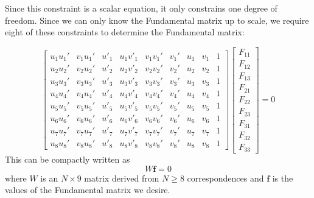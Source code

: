 \documentclass[a4paper, 12pt]{article}
\begin{document}
Since this constraint is a scalar equation, it only constrains one degree of freedom. Since we can only know the Fundamental matrix up to scale, we require eight of these constraints to determine the Fundamental matrix:

\begin{equation}
    \begin{bmatrix}
    u_1u_1' & v_1u_1' & u'_1 & u_1v'_1 &  v_1v_1' & v_1' & u_1 & v_1 & 1 \\ 
    u_2u_2' & v_2u_2' & u'_2 & u_2v'_2 &  v_2v_2' & v_2' & u_2 & v_2 & 1 \\
    u_3u_3' & v_3u_3' & u'_3 & u_3v'_3 &  v_3v_3' & v_3' & u_3 & v_3 & 1 \\
    u_4u_4' & v_4u_4' & u'_4 & u_4v'_4 &  v_4v_4' & v_4' & u_4 & v_4 & 1\\
    u_5u_5' & v_5u_5' & u'_5 & u_5v'_5 &  v_5v_5' & v_5' & u_5 & v_5 & 1\\
    u_6u_6' & v_6u_6' & u'_6 & u_6v'_6 &  v_6v_6' & v_6' & u_6 & v_6 & 1 \\
    u_7u_7' & v_7u_7' & u'_7 & u_7v'_7 &  v_7v_7' & v_7' & u_7 & v_7 & 1 \\
    u_8u_8' & v_8u_8' & u'_8 & u_8v'_8 &  v_8v_8' & v_8' & u_8 & v_8 & 1
    \end{bmatrix}
    \begin{bmatrix}F_{11}\\F_{12}\\F_{13}\\F_{21}\\F_{22}\\F_{23}\\F_{31}\\F_{32}\\F_{33}\end{bmatrix} = 0
\end{equation}
This can be compactly written as 
\begin{equation}
    W\mathbf{f} = 0
    \label{eq:compact_8}
\end{equation}
where $W$ is an $N\times 9$ matrix derived from $N \geq 8$ correspondences and $\mathbf{f}$ is the values of the Fundamental matrix we desire. 
\end{document}
